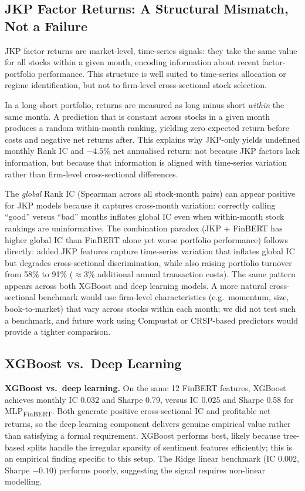 \label{sec:disc}

\subsection{JKP Factor Returns: A Structural Mismatch, Not a Failure}

JKP factor returns are market-level, time-series signals: they take the same value for all stocks within a given month, encoding information about recent factor-portfolio performance. This structure is well suited to time-series allocation or regime identification, but not to firm-level cross-sectional stock selection.

In a long-short portfolio, returns are measured as long minus short \textit{within} the same month. A prediction that is constant across stocks in a given month produces a random within-month ranking, yielding zero expected return before costs and negative net returns after. This explains why JKP-only yields undefined monthly Rank IC and $-4.5\%$ net annualised return: not because JKP factors lack information, but because that information is aligned with time-series variation rather than firm-level cross-sectional differences.

The \textit{global} Rank IC (Spearman across all stock-month pairs) can appear positive for JKP models because it captures cross-month variation: correctly calling ``good'' versus ``bad'' months inflates global IC even when within-month stock rankings are uninformative. The combination paradox (JKP + FinBERT has higher global IC than FinBERT alone yet worse portfolio performance) follows directly: added JKP features capture time-series variation that inflates global IC but degrades cross-sectional discrimination, while also raising portfolio turnover from 58\% to 91\% ($\approx$3\% additional annual transaction costs). The same pattern appears across both XGBoost and deep learning models. A more natural cross-sectional benchmark would use firm-level characteristics (e.g.\ momentum, size, book-to-market) that vary across stocks within each month; we did not test such a benchmark, and future work using Compustat or CRSP-based predictors would provide a tighter comparison.

\subsection{XGBoost vs.\ Deep Learning}

\textbf{XGBoost vs.\ deep learning.} On the same 12 FinBERT features, XGBoost achieves monthly IC 0.032 and Sharpe 0.79, versus IC 0.025 and Sharpe 0.58 for MLP\textsubscript{FinBERT}. Both generate positive cross-sectional IC and profitable net returns, so the deep learning component delivers genuine empirical value rather than satisfying a formal requirement. XGBoost performs best, likely because tree-based splits handle the irregular sparsity of sentiment features efficiently; this is an empirical finding specific to this setup. The Ridge linear benchmark (IC 0.002, Sharpe $-0.10$) performs poorly, suggesting the signal requires non-linear modelling.


